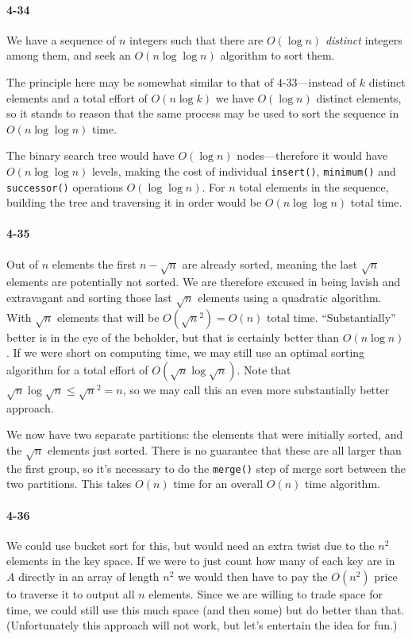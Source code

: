 \documentclass{report}
\newcommand{\li}{\lstinline}
\begin{document}
\paragraph{4-34} We have a sequence of $n$ integers such that there are $O(\log n)$ \emph{distinct} integers among them, and seek an $O(n\log\log n)$ algorithm to sort them.

The principle here may be somewhat similar to that of 4-33---instead of $k$ distinct elements and a total effort of $O(n\log k)$ we have $O(\log n)$ distinct elements, so it stands to reason that the same process may be used to sort the sequence in $O(n\log\log n)$ time.

The binary search tree would have $O(\log n)$ nodes---therefore it would have $O(n\log\log n)$ levels, making the cost of individual \li!insert()!, \li!minimum()! and \li!successor()! operations $O(\log\log n)$. For $n$ total elements in the sequence, building the tree and traversing it in order would be $O(n\log\log n)$ total time.

\paragraph{4-35} Out of $n$ elements the first $n-\sqrt{n}$ are already sorted, meaning the last $\sqrt{n}$ elements are potentially not sorted. We are therefore excused in being lavish and extravagant and sorting those last $\sqrt{n}$ elements using a quadratic algorithm. With $\sqrt{n}$ elements that will be $O(\sqrt{n}^2) = O(n)$ total time. ``Substantially'' better is in the eye of the beholder, but that is certainly better than $O(n\log n)$. If we were short on computing time, we may still use an optimal sorting algorithm for a total effort of $O(\sqrt{n}\log\sqrt{n})$. Note that $\sqrt{n}\log\sqrt{n} \le \sqrt{n}^2 = n$, so we may call this an even more substantially better approach.

We now have two separate partitions: the elements that were initially sorted, and the $\sqrt{n}$ elements just sorted. There is no guarantee that these are all larger than the first group, so it's necessary to do the \li!merge()! step of merge sort between the two partitions. This takes $O(n)$ time for an overall $O(n)$ time algorithm.

\paragraph{4-36} We could use bucket sort for this, but would need an extra twist due to the $n^2$ elements in the key space. If we were to just count how many of each key are in $A$ directly in an array of length $n^2$ we would then have to pay the $O(n^2)$ price to traverse it to output all $n$ elements. Since we are willing to trade space for time, we could still use this much space (and then some) but do better than that. (Unfortunately this approach will not work, but let's entertain the idea for fun.)
\end{document}
